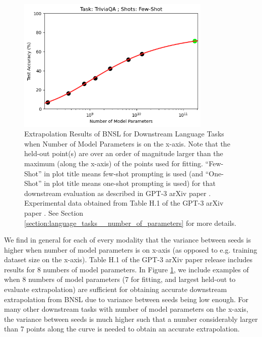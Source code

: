 \documentclass{article} %
\begin{document}
\begin{figure}[htbp]
\includegraphics[width=0.825\textwidth]{figures/gpt-3__parameter_scaling/TriviaQA___Few-Shot.png}

    \caption{
Extrapolation Results of BNSL for Downstream Language Tasks when Number of Model Parameters is on the x-axis. Note that the held-out point(s) are over an order of magnitude larger than the maximum (along the x-axis) of the points used for fitting. ``Few-Shot'' in plot title means few-shot prompting is used (and ``One-Shot'' in plot title means one-shot prompting is used) for that downstream evaluation as described in GPT-3 arXiv paper \citep{brown2020language}. Experimental data obtained from Table H.1 of the GPT-3 arXiv paper \citep{brown2020language}.
See Section \ref{section:language_tasks__number_of_parameters} for more details.
    }
    \label{fig:language_tasks__number_of_parameters}
\end{figure}

We find in general for each of every modality that the variance between seeds is higher when number of model parameters is on x-axis (as opposed to e.g. training dataset size on the x-axis). Table H.1 of the GPT-3 arXiv paper \citep{brown2020language} release includes results for 8 numbers of model parameters. In Figure \ref{fig:language_tasks__number_of_parameters}, we include examples of when 8 numbers of model parameters (7 for fitting, and largest held-out to evaluate extrapolation) are sufficient for obtaining accurate downstream extrapolation from BNSL due to variance between seeds being low enough. For many other downstream tasks with number of model parameters on the x-axis, the variance between seeds is much higher such that a number considerably larger than 7 points along the curve is needed to obtain an accurate extrapolation.
\end{document}
